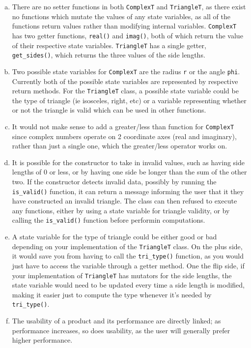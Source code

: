 \documentclass[12pt]{article}
\begin{document}
\begin{enumerate}[(a)]
\item There are no setter functions in both \verb|ComplexT| and \verb|TriangleT|, as there exist no functions which mutate the values of any state variables, as all of the functions return values rather than modifying internal variables. \verb|ComplexT| has two getter functions, \verb|real()| and \verb|imag()|, both of which return the value of their respective state variables. \verb|TriangleT| has a single getter, \verb|get_sides()|, which returns the three values of the side lengths. 	
\item Two possible state variables for \verb|ComplexT| are the radius \verb|r| or the angle \verb|phi|. Currently both of the possible state variables are represented by respective return methods. For the \verb|TriangleT| class, a possible state variable could be the type of triangle (ie isosceles, right, etc) or a variable representing whether or not the triangle is valid which can be used in other functions. 
\item It would not make sense to add a greater/less than function for \verb|ComplexT| since complex numbers operate on 2 coordinate axes (real and imaginary), rather than just a single one, which the greater/less operator works on. 
\item It is possible for the constructor to take in invalid values, such as having side lengths of 0 or less, or by having one side be longer than the sum of the other two. If the constructor detects invalid data, possibly by running the \verb|is_valid()| function, it can return a message informing the user that it they have constructed an invalid triangle. The class can then refused to execute any functions, either by using a state variable for triangle validity, or by calling the \verb|is_valid()| function before performin computations.
\item A state variable for the type of triangle could be either good or bad depending on your implementation of the \verb|TriangleT| class. On the plus side, it would save you from having to call the \verb|tri_type()| function, as you would just have to access the variable through a getter method. One the flip side, if your implementation of \verb|TriangleT| has mutators for the side lengths, the state variable would need to be updated every time a side length is modified, making it easier just to compute the type whenever it's needed by \verb|tri_type()|.	
\item The usability of a product and its performance are directly linked; as performance increases, so does usability, as the user will generally prefer higher performance. 

\end{enumerate}
\end{document}
